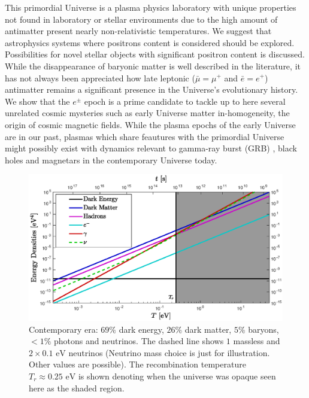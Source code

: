 \documentclass[universe,article,submit,moreauthors,pdftex,a4paper]{Definitions/mdpi}
\newcommand{\eV}{\text{ eV}}
\begin{document}
This primordial Universe is a plasma physics laboratory with unique properties not found in laboratory or stellar environments due to the high amount of antimatter present nearly non-relativistic temperatures. We suggest that astrophysics systems where positrons content is considered should be explored. Possibilities for novel stellar objects with significant positron content is discussed. While the disappearance of baryonic matter is well described in the literature, it has not always been appreciated how late leptonic ($\bar{\mu}=\mu^{+}$ and $\bar{e}=e^{+}$) antimatter remains a significant presence in the Universe's evolutionary history. We show that the $e^{\pm}$ epoch is a prime candidate to tackle up to here several unrelated cosmic mysteries such as early Universe matter in-homogeneity, the origin of cosmic magnetic fields. While the plasma epochs of the early Universe are in our past, plasmas which share feautures with the primordial Universe might possibly exist with dynamics relevant to gamma-ray burst (GRB) \cite{Ruffini:2001fe,Aksenov:2008ze,Ruffini:2012it,Han:2011er}, black holes \cite{Ruffini:2009hg,Ruffini:2000yu} and magnetars \cite{Duncan:1992hi,Belvedere:2012uc} in the contemporary Universe today.
\begin{figure}
  \centerline{\includegraphics[width=\textwidth]{./plots/energy_densities_new.eps}}
  \caption{Contemporary era: $69\%$ dark energy, $26\%$ dark matter, $5\%$ baryons, $<1\%$ photons and neutrinos.  The dashed line shows $1$ massless and $2\times 0.1\eV$ neutrinos (Neutrino mass choice is just for illustration.  Other values are possible). The recombination temperature $T_{r}\approx0.25\eV$ is shown denoting when the universe was opaque seen here as the shaded region. \label{CosmicDensity}}
\end{figure}
\end{document}
